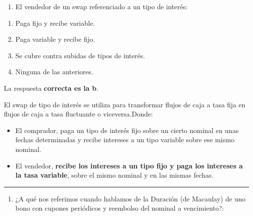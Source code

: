 \documentclass[
  letterpaper,
  DIV=11,
  numbers=noendperiod]{scrreprt}
\providecommand{\tightlist}{%
  \setlength{\itemsep}{0pt}\setlength{\parskip}{0pt}}\usepackage{longtable,booktabs,array}
\begin{document}
\begin{enumerate}
\def\labelenumi{\arabic{enumi}.}
\setcounter{enumi}{54}
\tightlist
\item
  El vendedor de un swap referenciado a un tipo de interés:
\end{enumerate}

\begin{enumerate}
\def\labelenumi{\alph{enumi}.}
\item
  Paga fijo y recibe variable.
\item
  Paga variable y recibe fijo.
\item
  Se cubre contra subidas de tipos de interés.
\item
  Ninguna de las anteriores.
\end{enumerate}

\begin{tcolorbox}[enhanced jigsaw, left=2mm, opacityback=0, colback=white, breakable, arc=.35mm, bottomrule=.15mm, rightrule=.15mm, toprule=.15mm, leftrule=.75mm, colframe=quarto-callout-tip-color-frame]
\begin{minipage}[t]{5.5mm}
\textcolor{quarto-callout-tip-color}{\faLightbulb}
\end{minipage}%
\begin{minipage}[t]{\textwidth - 5.5mm}

La respuesta \textbf{correcta es la b}.

El swap de tipo de interés se utiliza para transformar flujos de caja a
tasa fija en flujos de caja a tasa fluctuante o viceversa.Donde:

\begin{itemize}
\item
  El comprador, paga un tipo de interés fijo sobre un cierto nominal en
  unas fechas determinadas y recibe intereses a un tipo variable sobre
  ese mismo nominal.
\item
  El vendedor, \textbf{recibe los intereses a un tipo fijo y paga los
  intereses a la tasa variable}, sobre el mismo nominal y en las mismas
  fechas.
\end{itemize}

\end{minipage}%
\end{tcolorbox}

\begin{center}\rule{0.5\linewidth}{0.5pt}\end{center}

\begin{enumerate}
\def\labelenumi{\arabic{enumi}.}
\setcounter{enumi}{55}
\tightlist
\item
  ¿A qué nos referimos cuando hablamos de la Duración (de Macaulay) de
  uno bono con cupones periódicos y reembolso del nominal a
  vencimiento?:
\end{enumerate}
\end{document}
